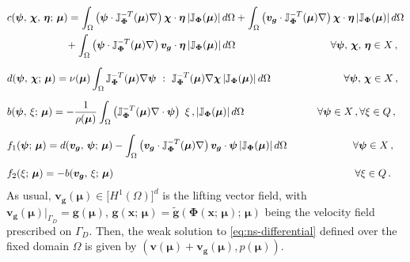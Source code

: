 \documentclass[12pt, a4paper, twoside, openright]{report}
\numberwithin{equation}{chapter}
\theoremstyle{theorem}
\theoremstyle{definition}
\theoremstyle{remark}
\theoremstyle{proposition}
\numberwithin{figure}{chapter}
\newcommand{\wt}[1]{\widetilde{#1}}
\newcommand{\bg}[1]{\boldsymbol{#1}}
\begin{document}
		\begin{subequations}
			\label{eq:ns-weak-forms}
			\begin{align}
				& c(\bg{\psi}, \, \bg{\chi}, \, \bg{\eta}; \, \bg{\mu}) = \int_{\Omega} \left( \bg{\psi} \cdot \mathbb{J}^{-T}_{\bg{\Phi}}(\bg{\mu}) \nabla \right) \bg{\chi} \cdot \bg{\eta} \, \lvert \mathbb{J}_{\bg{\Phi}}(\bg{\mu}) \rvert \, d \Omega + \int_{\Omega} \left( \bg{v}_{\bg{g}} \cdot \mathbb{J}^{-T}_{\bg{\Phi}}(\bg{\mu}) \nabla \right) \bg{\chi} \cdot \bg{\eta} \, \lvert \mathbb{J}_{\bg{\Phi}}(\bg{\mu}) \rvert \, d \Omega \notag \\
				\label{eq:ns-weak-forms-c-reference}
				& \hspace*{2cm} + \int_{\Omega} \left( \bg{\psi} \cdot \mathbb{J}^{-T}_{\bg{\Phi}}(\bg{\mu}) \nabla \right) \bg{v}_{\bg{g}} \cdot \bg{\eta} \, \lvert \mathbb{J}_{\bg{\Phi}}(\bg{\mu}) \rvert \, d \Omega \hspace*{3.25cm} \forall \bg{\psi}, \, \bg{\chi}, \, \bg{\eta} \in X \, , \\[0.2cm]
				\label{eq:ns-weak-forms-d-reference}
				& d(\bg{\psi}, \, \bg{\chi}; \, \bg{\mu}) = \nu(\bg{\mu}) \int_{\Omega} \mathbb{J}^{-T}_{\bg{\Phi}}(\bg{\mu}) \nabla \bg{\psi} ~ : ~ \mathbb{J}^{-T}_{\bg{\Phi}}(\bg{\mu}) \nabla \bg{\chi} \, \lvert \mathbb{J}_{\bg{\Phi}}(\bg{\mu}) \rvert \, d \Omega \hspace*{2.5cm} \forall \bg{\psi}, \, \bg{\chi} \in X \, , \\[0.2cm]
				\label{eq:ns-weak-forms-b-reference}
				& b(\bg{\psi}, \, \xi; \, \bg{\mu}) = - \dfrac{1}{\rho(\bg{\mu})} \int_{\Omega} \left( \mathbb{J}^{-T}_{\bg{\Phi}}(\bg{\mu}) \nabla \cdot \bg{\psi} \right) ~ \xi \, , \lvert \mathbb{J}_{\bg{\Phi}}(\bg{\mu}) \rvert \, d \Omega \hspace*{2.5cm} \forall \bg{\psi} \in X \, , \forall \xi \in Q \, , \\[0.2cm]
				\label{eq:ns-weak-forms-f1-reference}
				& f_1(\bg{\psi}; \, \bg{\mu}) = d(\bg{v}_{\bg{g}}, \, \bg{\psi}; \, \bg{\mu})- \int_{\Omega} \left( \bg{v}_{\bg{g}} \cdot \mathbb{J}^{-T}_{\bg{\Phi}}(\bg{\mu}) \nabla \right) \bg{v}_{\bg{g}} \cdot \bg{\psi} \, \lvert \mathbb{J}_{\bg{\Phi}}(\bg{\mu}) \rvert \, d \Omega \hspace*{2.25cm} \forall \bg{\psi} \in X \, , \\[0.2cm]
				\label{eq:ns-weak-forms-f2-reference}
				& f_2(\xi; \, \bg{\mu}) = - b(\bg{v}_{\bg{g}}, \, \xi; \, \bg{\mu}) \hspace*{8.25cm} \forall \xi \in Q \, .
			\end{align}
		\end{subequations}
		As usual, $\bg{v}_{\bg{g}}(\bg{\mu}) \in \big[ H^1(\Omega) \big]^d$ is the lifting vector field, with $\bg{v}_{\bg{g}}(\bg{\mu}) \big\rvert_{\Gamma_D} = \bg{g}(\bg{\mu})$, $\bg{g}(\bg{x}; \, \bg{\mu}) = \wt{\bg{g}}(\bg{\Phi}(\bg{x}; \, \bg{\mu}); \, \bg{\mu})$ being the velocity field prescribed on $\Gamma_D$. Then, the weak solution to \eqref{eq:ns-differential} defined over the fixed domain $\Omega$ is given by $(\bg{v}(\bg{\mu}) + \bg{v}_{\bg{g}}(\bg{\mu}), p(\bg{\mu}))$.
		
\end{document}
